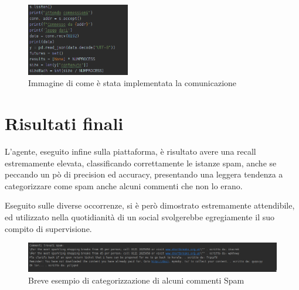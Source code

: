 \documentclass{report}
\begin{document}
    \begin{figure}[h!]
        \centering
        \includegraphics[width =0.4\textwidth]{immagini/socket.png}
        \caption{Immagine di come è stata implementata la comunicazione}

    \end{figure}

    \newpage
    \section{Risultati finali}
    L'agente, eseguito infine sulla piattaforma, è risultato avere una recall estremamente elevata, classificando
    correttamente le istanze spam, anche se peccando un pò di precision ed accuracy, presentando una leggera tendenza a 
    categorizzare come spam anche alcuni commenti che non lo erano.

    Eseguito sulle diverse occorrenze, si è però dimostrato estremamente attendibile, ed utilizzato nella quotidianità
    di un social svolgerebbe egregiamente il suo compito di supervisione.

    \begin{figure}[h!]
        \centering
        \includegraphics[width =\textwidth]{immagini/commentiSpam.png}
        \caption{Breve esempio di categorizzazione di alcuni commenti Spam}

\end{figure}
\end{document}
